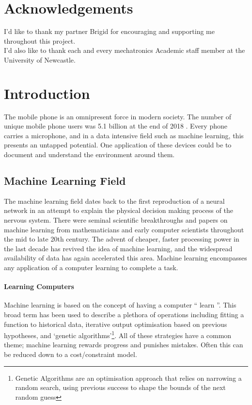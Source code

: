\documentclass{UoNMCHA}
\newcommand{\inlineQuote}[1]{`` #1 ''}
\numberwithin{equation}{section}
\begin{document}
\section*{Acknowledgements}
\vspace{-3mm}
I'd like to thank my partner Brigid for encouraging and supporting me throughout this project. \\

I'd also like to thank each and every mechatronics Academic staff member at the University of Newcastle.%

\newpage
\tableofcontents
\newpage
\clearpage \section{Introduction}
 
The mobile phone is an omnipresent force in modern society. The number of unique mobile phone users was 5.1 billion at the end of 2018 \cite{GSMA}. Every phone carries a microphone, and in a data intensive field such as machine learning, this presents an untapped potential. One application of these devices could be to document and understand the environment around them.

\subsection{Machine Learning Field}
The machine learning field dates back to the first reproduction of a neural network \cite{mcculloch1943logical} in an attempt to explain the physical decision making process of the nervous system. There were seminal scientific breakthroughs and papers on machine learning from mathematicians and early computer scientists throughout the mid to late 20th century. The advent of cheaper, faster processing power in the last decade has revived the idea of machine learning, and the widespread availability of data has again accelerated this area. Machine learning encompasses any application of a computer learning to complete a task.

\paragraph{Learning Computers}
Machine learning is based on the concept of having a computer \inlineQuote{learn}. This broad term has been used to describe a plethora of operations including fitting a function to historical data, iterative output optimisation based on previous hypotheses, and `genetic algorithms'\footnote{Genetic Algorithms are an optimisation approach that relies on narrowing a random search, using previous success to shape the bounds of the next random guess}. All of these strategies have a common theme; machine learning rewards progress and punishes mistakes. Often this can be reduced down to a cost/constraint model.
\end{document}
